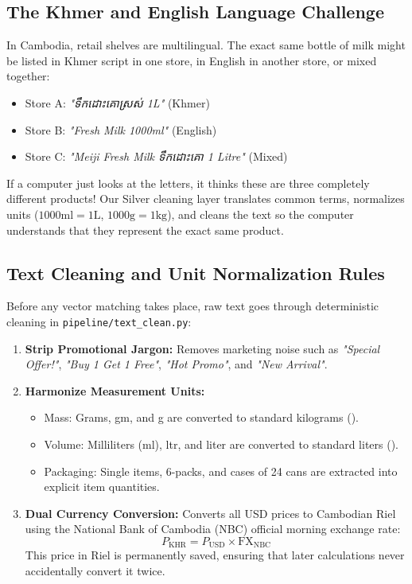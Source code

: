 \documentclass[11pt,a4paper,oneside]{article}
\newcommand{\khmer}[1]{{\khmerfont #1}}
\begin{document}
\subsection{The Khmer and English Language Challenge}
In Cambodia, retail shelves are multilingual. The exact same bottle of milk might be listed in Khmer script in one store, in English in another store, or mixed together:
\begin{itemize}
    \item Store A: \textit{"\khmer{ទឹកដោះគោស្រស់} 1L"} (Khmer)
    \item Store B: \textit{"Fresh Milk 1000ml"} (English)
    \item Store C: \textit{"Meiji Fresh Milk \khmer{ទឹកដោះគោ} 1 Litre"} (Mixed)
\end{itemize}
If a computer just looks at the letters, it thinks these are three completely different products! Our Silver cleaning layer translates common terms, normalizes units ($1000\text{ml} = 1\text{L}$, $1000\text{g} = 1\text{kg}$), and cleans the text so the computer understands that they represent the exact same product.

\subsection{Text Cleaning and Unit Normalization Rules}
Before any vector matching takes place, raw text goes through deterministic cleaning in \texttt{pipeline/text\_clean.py}:
\begin{enumerate}
    \item \textbf{Strip Promotional Jargon:} Removes marketing noise such as \textit{"Special Offer!"}, \textit{"Buy 1 Get 1 Free"}, \textit{"Hot Promo"}, and \textit{"New Arrival"}.
    \item \textbf{Harmonize Measurement Units:}
    \begin{itemize}
        \item Mass: Grams, gm, and g are converted to standard kilograms ().
        \item Volume: Milliliters (ml), ltr, and liter are converted to standard liters ().
        \item Packaging: Single items, 6-packs, and cases of 24 cans are extracted into explicit item quantities.
    \end{itemize}
    \item \textbf{Dual Currency Conversion:} Converts all USD prices to Cambodian Riel using the National Bank of Cambodia (NBC) official morning exchange rate:
    $$P_{\text{KHR}} = P_{\text{USD}} \times \text{FX}_{\text{NBC}}$$
    This price in Riel is permanently saved, ensuring that later calculations never accidentally convert it twice.
\end{enumerate}
\end{document}
